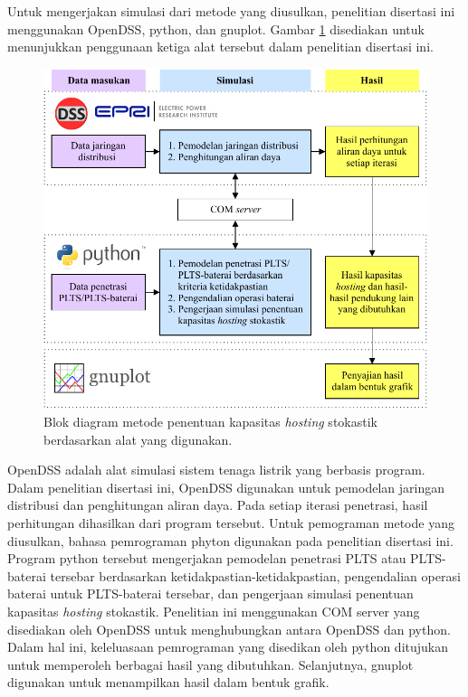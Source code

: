 Untuk mengerjakan simulasi dari metode yang diusulkan, penelitian disertasi ini menggunakan OpenDSS, python, dan gnuplot. Gambar \ref{opendss-python} disediakan untuk menunjukkan penggunaan ketiga alat tersebut dalam penelitian disertasi ini. 
\begin{figure}[!h]
	\centering
	\includegraphics[width=1\textwidth]{Fig/opendss-python}
	\caption{Blok diagram metode penentuan kapasitas \textit{\textit{hosting}} stokastik berdasarkan alat yang digunakan.}
	\label{opendss-python}
\end{figure}
OpenDSS adalah alat simulasi sistem tenaga listrik yang berbasis program. Dalam penelitian disertasi ini, OpenDSS digunakan untuk pemodelan jaringan distribusi dan penghitungan aliran daya. Pada setiap iterasi penetrasi, hasil perhitungan dihasilkan dari program tersebut. Untuk pemograman metode yang diusulkan, bahasa pemrograman phyton digunakan pada penelitian disertasi ini. Program python tersebut mengerjakan pemodelan penetrasi PLTS atau PLTS-baterai tersebar berdasarkan ketidakpastian-ketidakpastian, pengendalian operasi baterai untuk PLTS-baterai tersebar, dan pengerjaan simulasi penentuan kapasitas \textit{\textit{hosting}} stokastik. Penelitian ini menggunakan COM server yang disediakan oleh OpenDSS untuk menghubungkan antara OpenDSS dan python. Dalam hal ini, keleluasaan pemrograman yang disedikan oleh python ditujukan untuk memperoleh berbagai hasil yang dibutuhkan. Selanjutnya, gnuplot digunakan untuk menampilkan hasil dalam bentuk grafik.

